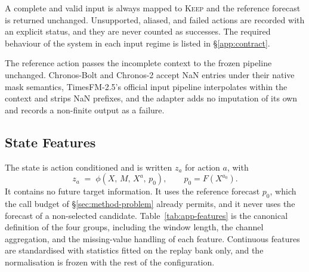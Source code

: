 \documentclass{article}
\begin{document}
A complete and valid input is always mapped to \textsc{Keep} and the reference forecast is
returned unchanged. Unsupported, aliased, and failed actions are recorded with an explicit
status, and they are never counted as successes. The required behaviour of the system in each
input regime is listed in \S\ref{app:contract}.

The reference action passes the incomplete context to the frozen pipeline unchanged.
Chronos-Bolt and Chronos-2 accept NaN entries under their native mask semantics, TimesFM-2.5's
official input pipeline interpolates within the context and strips NaN prefixes, and the adapter
adds no imputation of its own and records a non-finite output as a failure.

\subsection{State Features}
\label{app:features}
The state is action conditioned and is written $z_a$ for action $a$, with
\begin{equation}
  z_a \;=\; \phi\!\left(X,\, M,\, X^{a},\, p_0\right),
  \qquad p_0 = F(X^{a_0}) .
  \label{eq:app-state}
\end{equation}
It contains no future target information. It uses the reference forecast $p_0$, which the
call budget of \S\ref{sec:method-problem} already permits, and it never uses the forecast of a
non-selected candidate. Table~\ref{tab:app-features} is the canonical definition of the four
groups, including the window length, the channel aggregation, and the missing-value handling
of each feature. Continuous features are standardised with statistics fitted on the replay
bank only, and the normalisation is frozen with the rest of the configuration.
\end{document}
